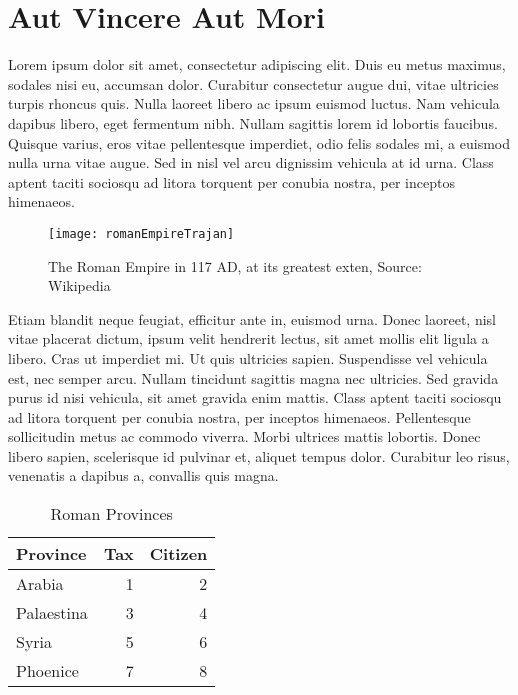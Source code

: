 \chapter{Aut Vincere Aut Mori}\label{cha:conquer}

Lorem ipsum dolor sit amet, consectetur adipiscing elit. Duis eu metus maximus, sodales nisi eu, accumsan dolor. Curabitur consectetur augue dui, vitae ultricies turpis rhoncus quis. Nulla laoreet libero ac ipsum euismod luctus. Nam vehicula dapibus libero, eget fermentum nibh. Nullam sagittis lorem id lobortis faucibus. Quisque varius, eros vitae pellentesque imperdiet, odio felis sodales mi, a euismod nulla urna vitae augue. Sed in nisl vel arcu dignissim vehicula at id urna. Class aptent taciti sociosqu ad litora torquent per conubia nostra, per inceptos himenaeos.


\begin{figure}[ht!]\centering
\texttt{[image: romanEmpireTrajan]}
\caption{The Roman Empire in 117 AD, at its greatest exten, Source: Wikipedia\label{fig:romanEmpireTrajan}}
\end{figure}

Etiam blandit neque feugiat, efficitur ante in, euismod urna. Donec laoreet, nisl vitae placerat dictum, ipsum velit hendrerit lectus, sit amet mollis elit ligula a libero. Cras ut imperdiet mi. Ut quis ultricies sapien. Suspendisse vel vehicula est, nec semper arcu. Nullam tincidunt sagittis magna nec ultricies. Sed gravida purus id nisi vehicula, sit amet gravida enim mattis. Class aptent taciti sociosqu ad litora torquent per conubia nostra, per inceptos himenaeos. Pellentesque sollicitudin metus ac commodo viverra. Morbi ultrices mattis lobortis. Donec libero sapien, scelerisque id pulvinar et, aliquet tempus dolor. Curabitur leo risus, venenatis a dapibus a, convallis quis magna.

\begin{table}[ht!]\centering\small{
\begin{tabularx}{0.4\textwidth}{Xrr}
\toprule
Province & Tax & Citizen\\
\midrule
\rowcolor[gray]{0.9}Arabia      & 1 & 2 \\
					Palaestina  & 3 & 4 \\ 
\rowcolor[gray]{0.9}Syria	    & 5 & 6 \\
					Phoenice    & 7 & 8 \\ 
\bottomrule     	
\end{tabularx}}
\caption{Roman Provinces\label{tab:romanProvinces}}
\end{table}

